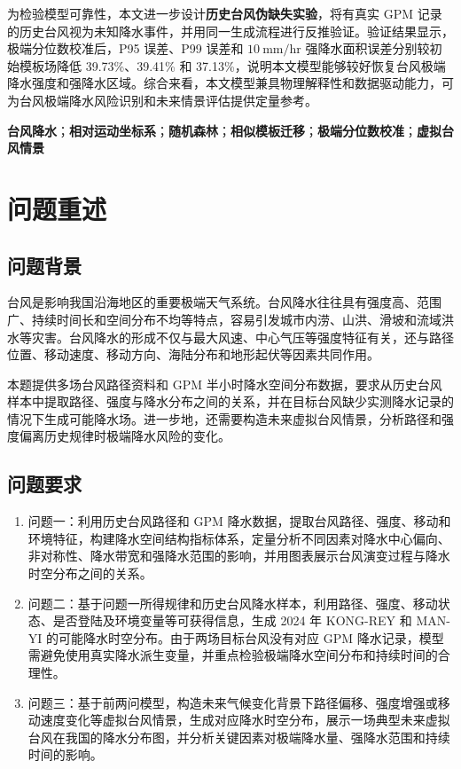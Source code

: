 \documentclass[UTF8,a4paper,zihao=5,fontset=fandol]{ctexart}
\numberwithin{equation}{section}
\numberwithin{figure}{section}
\numberwithin{table}{section}
\begin{document}
为检验模型可靠性，本文进一步设计\textbf{历史台风伪缺失实验}，将有真实 GPM 记录的历史台风视为未知降水事件，并用同一生成流程进行反推验证。验证结果显示，极端分位数校准后，P95 误差、P99 误差和 $10\ \mathrm{mm/hr}$ 强降水面积误差分别较初始模板场降低 39.73\%、39.41\% 和 37.13\%，说明本文模型能够较好恢复台风极端降水强度和强降水区域。综合来看，本文模型兼具物理解释性和数据驱动能力，可为台风极端降水风险识别和未来情景评估提供定量参考。

\vspace{0.8em}
\textbf{台风降水}；\textbf{相对运动坐标系}；\textbf{随机森林}；\textbf{相似模板迁移}；\textbf{极端分位数校准}；\textbf{虚拟台风情景}

\newpage


\section{问题重述}

\subsection{问题背景}
台风是影响我国沿海地区的重要极端天气系统。台风降水往往具有强度高、范围广、持续时间长和空间分布不均等特点，容易引发城市内涝、山洪、滑坡和流域洪水等灾害。台风降水的形成不仅与最大风速、中心气压等强度特征有关，还与路径位置、移动速度、移动方向、海陆分布和地形起伏等因素共同作用。

本题提供多场台风路径资料和 GPM 半小时降水空间分布数据，要求从历史台风样本中提取路径、强度与降水分布之间的关系，并在目标台风缺少实测降水记录的情况下生成可能降水场。进一步地，还需要构造未来虚拟台风情景，分析路径和强度偏离历史规律时极端降水风险的变化。

\subsection{问题要求}
\begin{enumerate}
  \item 问题一：利用历史台风路径和 GPM 降水数据，提取台风路径、强度、移动和环境特征，构建降水空间结构指标体系，定量分析不同因素对降水中心偏向、非对称性、降水带宽和强降水范围的影响，并用图表展示台风演变过程与降水时空分布之间的关系。
  \item 问题二：基于问题一所得规律和历史台风降水样本，利用路径、强度、移动状态、是否登陆及环境变量等可获得信息，生成 2024 年 KONG-REY 和 MAN-YI 的可能降水时空分布。由于两场目标台风没有对应 GPM 降水记录，模型需避免使用真实降水派生变量，并重点检验极端降水空间分布和持续时间的合理性。
  \item 问题三：基于前两问模型，构造未来气候变化背景下路径偏移、强度增强或移动速度变化等虚拟台风情景，生成对应降水时空分布，展示一场典型未来虚拟台风在我国的降水分布图，并分析关键因素对极端降水量、强降水范围和持续时间的影响。
\end{enumerate}
\end{document}
